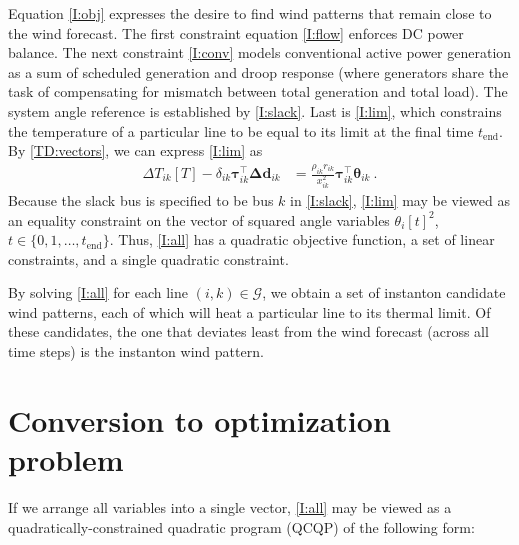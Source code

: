 \documentclass[conference]{IEEEtran}
\begin{document}


Equation \eqref{I:obj} expresses the desire to find wind patterns that remain close to the wind forecast. The first constraint equation \eqref{I:flow} enforces DC power balance. The next constraint \eqref{I:conv} models conventional active power generation as a sum of
scheduled generation and droop response (where generators share the task of compensating for mismatch between total generation and total load). The system angle reference is established by \eqref{I:slack}. Last is \eqref{I:lim}, which constrains the temperature of a particular line to be equal to its limit at the final time $t_\text{end}$. By \eqref{TD:vectors}, we can express \eqref{I:lim} as
\begin{align}\label{temp}
\Delta T_{ik}[T] - \delta_{ik} \boldsymbol{\tau}_{ik}^\top \boldsymbol{\Delta d}_{ik}  &= \frac{\rho_{ik}r_{ik}}{x_{ik}^2} \boldsymbol{\tau}_{ik}^\top \boldsymbol{\theta}_{ik}~.
\end{align}
Because the slack bus is specified to be bus $k$ in \eqref{I:slack}, \eqref{I:lim} may be viewed as an equality constraint on the vector of squared angle variables $\theta_i[t]^2$, $t\in \{0,1,\ldots,t_\text{end}\}$. Thus, \eqref{I:all} has a quadratic objective function, a set of linear constraints, and a single quadratic constraint.

By solving \eqref{I:all} for each line $(i,k)\in\mathcal G$, we obtain a set of instanton candidate wind patterns, each of which will heat a particular line to its thermal limit. Of these candidates, the one that deviates least from the wind forecast (across all time steps) is the instanton wind pattern.

\section{Conversion to optimization problem}

If we arrange all variables into a single vector, \eqref{I:all} may be viewed as a quadratically-constrained quadratic program (QCQP) of the following form:
\end{document}
